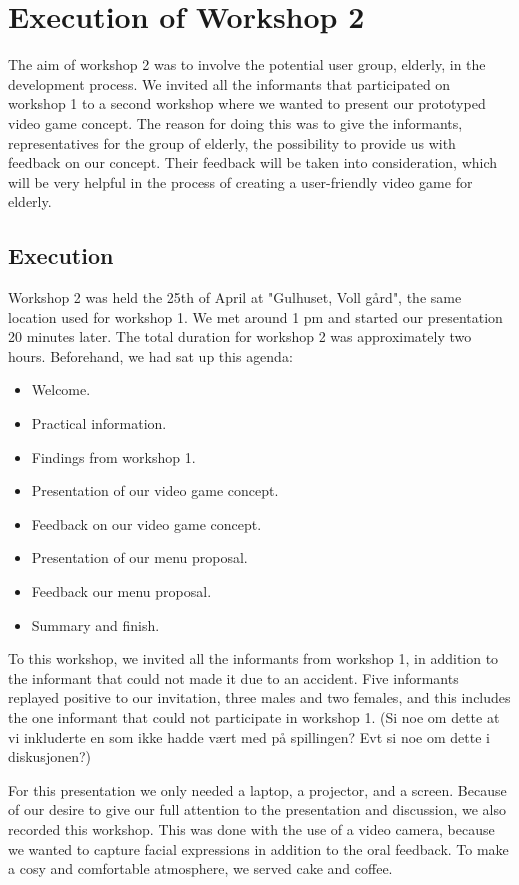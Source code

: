\chapter{Execution of Workshop 2}
The aim of workshop 2 was to involve the potential user group, elderly, in the development process. We invited all the informants that participated on workshop 1 to a second workshop where we wanted to present our prototyped video game concept. The reason for doing this was to give the informants, representatives for the group of elderly, the possibility to provide us with feedback on our concept. Their feedback will be taken into consideration, which will be very helpful in the process of creating a user-friendly video game for elderly.  

\section{Execution}
Workshop 2 was held the 25th of April at "Gulhuset, Voll gård", the same location used for workshop 1. We met around 1 pm and started our presentation 20 minutes later. The total duration for workshop 2 was approximately two hours. Beforehand, we had sat up this agenda:

\begin{itemize}
\renewcommand{\labelitemi}{$\bullet$}
\item Welcome.
\item Practical information.
\item Findings from workshop 1.
\item Presentation of our video game concept.
\item Feedback on our video game concept.
\item Presentation of our menu proposal.
\item Feedback our menu proposal.
\item Summary and finish.
\end{itemize}

To this workshop, we invited all the informants from workshop 1, in addition to the informant that could not made it due to an accident. Five informants replayed positive to our invitation, three males and two females, and this includes the one informant that could not participate in workshop 1. (Si noe om dette at vi inkluderte en som ikke hadde vært med på spillingen? Evt si noe om dette i diskusjonen?)

For this presentation we only needed a laptop, a projector, and a screen. Because of our desire to give our full attention to the presentation and discussion, we also recorded this workshop. This was done with the use of a video camera, because we wanted to capture facial expressions in addition to the oral feedback. To make a cosy and comfortable atmosphere, we served cake and coffee.   

